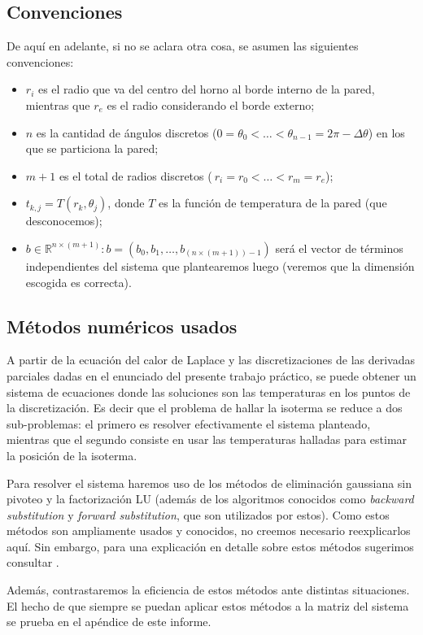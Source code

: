 \subsection{Convenciones}
De aquí en adelante, si no se aclara otra cosa, se asumen las siguientes convenciones:
\begin{itemize}
\item$r_i$ es el radio que va del centro del horno al borde interno de la pared, mientras que $r_e$ es el radio considerando el borde externo;
\item$n$ es la cantidad de ángulos discretos ($0=\theta_0 <\hdots< \theta_{n-1} = 2\pi - \Delta \theta$) en los que se particiona la pared;
\item$m+1$ es el total de radios discretos ($~{r_i=r_0<\hdots<r_m=r_e}$); 
\item$t_{k,j} = T(r_k, \theta_j)$, donde $T$ es la función de temperatura de la pared (que desconocemos);
\item$b\in \mathbb{R}^{n\times (m+1)}: b = (b_0, b_1, \hdots, b_{(n\times (m+1))-1})$ será el vector de términos independientes del sistema que plantearemos luego (veremos que la dimensión escogida es correcta). 
\end{itemize}
\subsection{Métodos numéricos usados}
\label{sec:metodos}
A partir de la ecuación del calor de Laplace y las discretizaciones de las derivadas parciales dadas en el enunciado del presente trabajo práctico, se puede obtener un sistema de ecuaciones donde las soluciones son las temperaturas en los puntos de la discretización. 
Es decir que el problema de hallar la isoterma se reduce a dos sub-problemas: el primero es resolver efectivamente el sistema planteado, mientras que el segundo consiste en usar las temperaturas halladas para estimar la posición de la isoterma.

Para resolver el sistema haremos uso de los métodos de eliminación gaussiana sin pivoteo y la factorización LU (además de los algoritmos conocidos como \emph{backward substitution} y \emph{forward substitution}, que son utilizados por estos). Como estos métodos son ampliamente usados y conocidos, no creemos necesario reexplicarlos aquí. Sin embargo, para una explicación en detalle sobre estos métodos sugerimos consultar \cite[Cap 5.3]{dahlquist}.

Además, contrastaremos la eficiencia de estos métodos ante distintas situaciones. El hecho de que siempre se puedan aplicar estos métodos a la matriz del sistema se prueba en el apéndice de este informe.  


